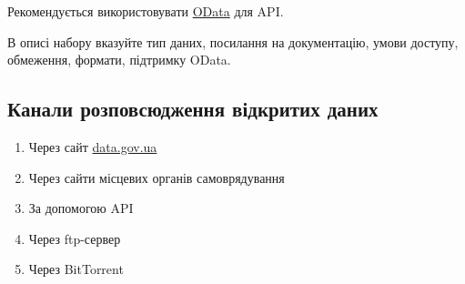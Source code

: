 Рекомендується використовувати \href{http://www.odata.org/}{OData} для API.

В описі набору вказуйте тип даних, посилання на документацію, умови доступу, обмеження, формати, підтримку OData.

\subsection{Канали розповсюдження відкритих даних}

\begin{enumerate}
    \item Через сайт \href{https://data.gov.ua}{data.gov.ua}
    \item Через сайти місцевих органів самоврядування
    \item За допомогою API
    \item Через ftp-сервер
    \item Через BitTorrent
\end{enumerate}
